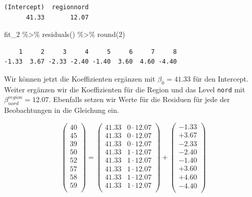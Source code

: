 \documentclass[
  letterpaper,
]{scrbook}
\newenvironment{Shaded}{\begin{snugshade}}{\end{snugshade}}
\newcommand{\DecValTok}[1]{\textcolor[rgb]{0.68,0.00,0.00}{#1}}
\newcommand{\FunctionTok}[1]{\textcolor[rgb]{0.28,0.35,0.67}{#1}}
\newcommand{\NormalTok}[1]{\textcolor[rgb]{0.00,0.23,0.31}{#1}}
\newcommand{\SpecialCharTok}[1]{\textcolor[rgb]{0.37,0.37,0.37}{#1}}
\begin{document}
\begin{verbatim}
(Intercept)  regionnord 
      41.33       12.07 
\end{verbatim}

\begin{Shaded}
\begin{Highlighting}[]
\NormalTok{fit\_2 }\SpecialCharTok{\%\textgreater{}\%} \FunctionTok{residuals}\NormalTok{() }\SpecialCharTok{\%\textgreater{}\%} \FunctionTok{round}\NormalTok{(}\DecValTok{2}\NormalTok{)}
\end{Highlighting}
\end{Shaded}

\begin{verbatim}
    1     2     3     4     5     6     7     8 
-1.33  3.67 -2.33 -2.40 -1.40  3.60  4.60 -4.40 
\end{verbatim}

Wir können jetzt die Koeffizienten ergänzen mit \(\beta_0 = 41.33\) für
den Intercept. Weiter ergänzen wir die Koeffizienten für die Region und
das Level \texttt{nord} mit \(\beta^{region}_{nord} = 12.07\). Ebenfalls
setzen wir Werte für die Residuen für jede der Beobachtungen in die
Gleichung ein.

\[
 \begin{pmatrix}
  40 \\
  45 \\
  39 \\
  50 \\
  52 \\
  57 \\
  58 \\
  59 \\
 \end{pmatrix}
 =
  \begin{pmatrix}
  41.33 & 0 \cdot 12.07  \\
  41.33 & 0 \cdot 12.07  \\
  41.33 & 0 \cdot 12.07  \\
  41.33 & 1 \cdot 12.07  \\
  41.33 & 1 \cdot 12.07  \\
  41.33 & 1 \cdot 12.07  \\
  41.33 & 1 \cdot 12.07  \\
  41.33 & 1 \cdot 12.07  \\
 \end{pmatrix} +
  \begin{pmatrix}
  -1.33\\
  +3.67 \\
  -2.33 \\
  -2.40 \\
  -1.40 \\
  +3.60 \\
  +4.60 \\
  -4.40 \\
 \end{pmatrix}
\]
\end{document}
